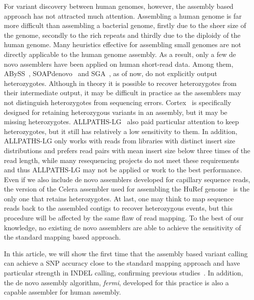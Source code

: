 \documentclass{bioinfo}
\begin{document}
For variant discovery between human genomes, however, the assembly based
approach has not attracted much attention. Assembling a human genome is far
more difficult than assembling a bacterial genome, firstly due to the sheer
size of the genome, secondly to the rich repeats and thirdly due to the
diploidy of the human genome. Many heuristics effective for assembling small
genomes are not directly applicable to the human genome assembly. As a result,
only a few de novo assemblers have been applied on human short-read data. Among
them, ABySS~\citep{Simpson:2009ys}, SOAPdenovo~\citep{Li:2010vn} and
SGA~\citep{Simpson:2011ly}, as of now, do not explicitly output heterozygotes.
Although in theory it is possible to recover heterozygotes from their
intermediate output, it may be difficult in practice as the assemblers may not
distinguish heterozygotes from sequencing errors. Cortex~\citep{Iqbal:2012ys}
is specifically designed for retaining heterozygous variants in an assembly,
but it may be missing heterozygotes. ALLPATHS-LG~\citep{Gnerre:2011ys}
also paid particular attention to keep heterozygotes, but it still has
relatively a low sensitivity to them. In addition, ALLPATHS-LG only works with
reads from libraries with distinct insert size distributions and prefers read
pairs with mean insert size below three times of the read length, while many
resequencing projects do not meet these requirements and thus ALLPATHS-LG may
not be applied or work to the best performance. Even if we also include de novo
assemblers developed for capillary sequence reads, the version of the Celera
assembler used for assembling the HuRef genome~\citep{Levy:2007uq} is the only
one that retains heterozygotes. At last, one may think to map sequence reads
back to the assembled contigs to recover heterozygous events, but this
procedure will be affected by the same flaw of read mapping. To the best of our
knowledge, no existing de novo assemblers are able to achieve the sensitivity
of the standard mapping based approach.

In this article, we will show the first time that the assembly based variant
calling can achieve a SNP accuracy close to the standard mapping approach
and have particular strength in INDEL calling, confirming previous
studies~\citep{Iqbal:2012ys}. In addition, the de novo assembly
algorithm, \emph{fermi}, developed for this practice is also a capable
assembler for human assembly.
\end{document}
